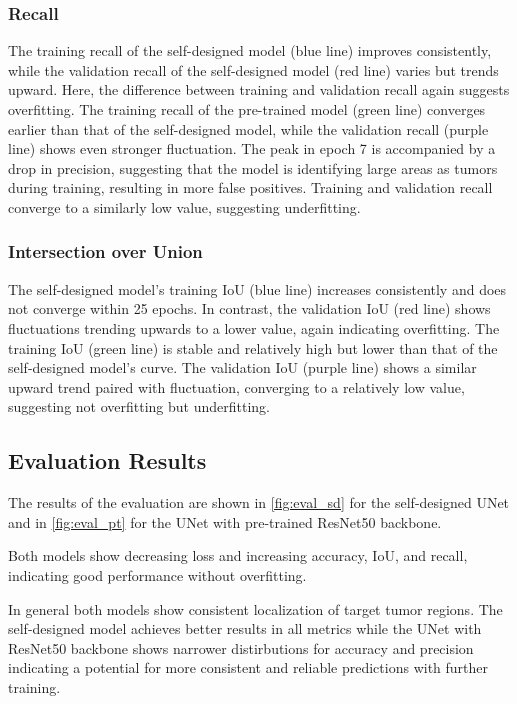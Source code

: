 \documentclass[lettersize,journal]{IEEEtran}
\begin{document}
\subsubsection{\textbf{Recall}}
The training recall of the self-designed model (blue line) improves consistently, while the validation recall of the self-designed model (red line) varies but trends upward. Here, the difference between training and validation recall again suggests overfitting. The training recall of the pre-trained model (green line) converges earlier than that of the self-designed model, while the validation recall (purple line) shows even stronger fluctuation. The peak in epoch 7 is accompanied by a drop in precision, suggesting that the model is identifying large areas as tumors during training, resulting in more false positives. Training and validation recall converge to a similarly low value, suggesting underfitting.


\subsubsection{\textbf{Intersection over Union}}
The self-designed model's training IoU (blue line) increases consistently and does not converge within 25 epochs. In contrast, the validation IoU (red line) shows fluctuations trending upwards to a lower value, again indicating overfitting. The training IoU (green line) is stable and relatively high but lower than that of the self-designed model’s curve. The validation IoU (purple line) shows a similar upward trend paired with fluctuation, converging to a relatively low value, suggesting not overfitting but underfitting.

\subsection{Evaluation Results}
The results of the evaluation are shown in \cref{fig:eval_sd} for the self-designed UNet and in \cref{fig:eval_pt} for the UNet with pre-trained ResNet50 backbone.

Both models show decreasing loss and increasing accuracy, IoU, and recall, indicating good performance without overfitting.

In general both models show consistent localization of target tumor regions. The self-designed model achieves better results in all metrics while the UNet with ResNet50 backbone shows narrower distirbutions for accuracy and precision indicating a potential for more consistent and reliable predictions with further training.
\end{document}
